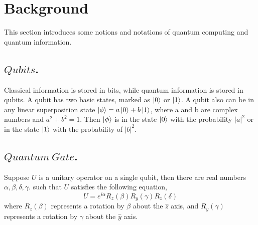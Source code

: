 \documentclass[runningheads]{llncs}
\begin{document}
\section{Background}
\label{Background}
This section introduces some notions and notations of quantum computing and quantum information.

\subsection{$Qubits$.}
Classical information is stored in bits, while quantum information is stored in qubits. 
A qubit has two basic states, marked as $\left\vert{0}\right\rangle$ or $\left\vert{1}\right\rangle$. A qubit also can be in any linear superposition 
state $\left\vert{\phi}\right\rangle=a\left\vert{0}\right\rangle+b\left\vert{1}\right\rangle$, where a and b are complex numbers and $a^{2}+b^{2}=1$. 
Then $\left\vert{\phi}\right\rangle$ is in the state $\left\vert{0}\right\rangle$ with the probability $|a|^{2}$ 
or in the state $\left\vert{1}\right\rangle$ with the probability of $|b|^{2}$. 
\subsection{$Quantum \ Gate$.}
Suppose $U$ is a unitary operator on a single qubit,
 then there are real numbers $\alpha, \beta, \delta, \gamma$.
such that $U$ satisfies the following equation,
 \begin{equation}
	U=e^{i\alpha}R_{z}(\beta)R_{y}(\gamma)R_{z}(\delta)
\end{equation}
where $R_{z}(\beta)$ represents a rotation by $\beta$ about the $\hat{z}$ axis, 
and $R_{y}(\gamma)$ represents a rotation by $\gamma$ about the $\hat{y}$ axis.
\end{document}
